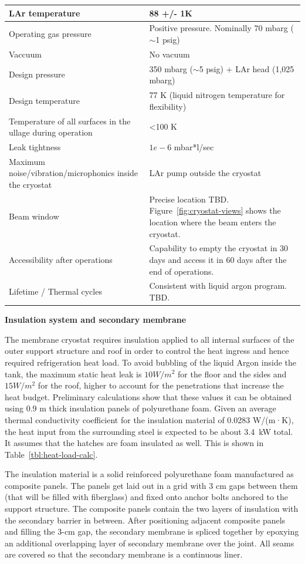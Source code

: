 \begin{table}[htpb]
\begin{tabular}{|p{}|p{}|}
LAr temperature   & 88 +/- 1K  \\ \hline
Operating gas pressure   &  Positive pressure. Nominally 70 mbarg ($\sim$1 psig) \\ \hline
 Vaccuum  &  No vacuum \\ \hline
 Design pressure  &  350 mbarg ($\sim$5 psig) + LAr head (1,025 mbarg) \\ \hline
Design temperature   &  77 K (liquid nitrogen temperature for flexibility) \\ \hline
Temperature of all surfaces in the ullage during operation   & \textless 100 K  \\ \hline
Leak tightness   & $1e-6$ mbar*l/sec   \\ \hline
Maximum noise/vibration/microphonics inside the cryostat   & LAr pump outside the cryostat  \\ \hline
Beam window   & Precise location TBD. Figure~\ref{fig:cryostat-views} shows the location where the beam enters the cryostat.  \\ \hline
 Accessibility after operations  & Capability to empty the cryostat in 30 days and access it in 60 days after the end of operations. \\ \hline
  Lifetime / Thermal cycles &  Consistent with liquid argon program. TBD. \\ \hline
 \end{tabular}
\end{table}

\textbf{Insulation system and secondary membrane}

The membrane cryostat requires insulation applied to all internal surfaces of the outer support structure 
and roof in order to control the heat ingress and hence required refrigeration heat load. 
To avoid bubbling of the liquid Argon inside the tank, the maximum static heat leak is $10 W/m^2$ for the floor and the sides and $15 W/m^2$ for the roof, higher to account for the penetrations that increase the heat budget. Preliminary calculations show that these values it can be obtained using 0.9 m thick insulation panels of polyurethane foam.
Given an 
average thermal conductivity coefficient for the insulation material of 0.0283 W/(m·K), the heat input 
from the surrounding steel is expected to be about 3.4~kW total. It assumes that the hatches are foam 
insulated as well. This is shown in Table~\ref{tbl:heat-load-calc}.

The insulation material is a solid reinforced polyurethane foam manufactured as composite panels. The 
panels get laid out in a grid with 3 cm gaps between them (that will be filled with fiberglass) and fixed 
onto anchor bolts anchored to the support structure. The composite panels contain the two layers of 
insulation with the secondary barrier in between. After positioning adjacent composite panels and filling 
the 3-cm gap, the secondary membrane is spliced together by epoxying an additional overlapping layer 
of secondary membrane over the joint. All seams are covered so that the secondary membrane is a 
continuous liner.

